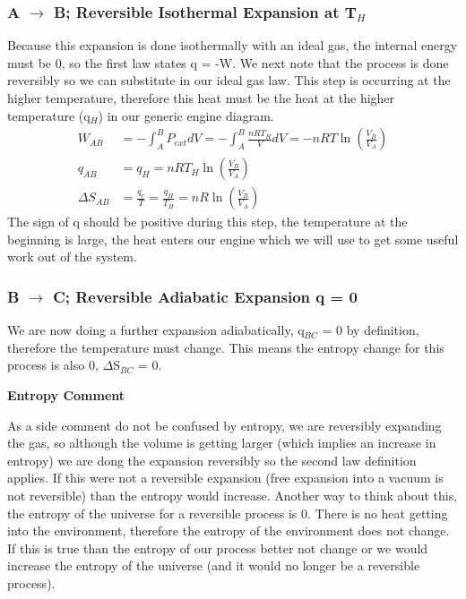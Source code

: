 \documentclass{article}
\begin{document}
\subsubsection*{A $\rightarrow$ B; Reversible Isothermal Expansion at T$_H$}
Because this expansion is done isothermally with an ideal gas, the internal energy must be 0, so the first law states q = -W. 
We next note that the process is done reversibly so we can substitute in our ideal gas law.
This step is occurring at the higher temperature, therefore this heat must be the heat at the higher temperature (q$_H$) in our generic engine diagram. 
\begin{equation}
\begin{split}
W_{AB} &= -\int_A^B P_{ext}dV = -\int_A^B \frac{nRT_H}{V}dV = -nRT\ln\left(\frac{V_B}{V_A}\right) \\
q_{AB} &= q_H = nRT_H\ln\left(\frac{V_B}{V_A}\right) \\
\Delta S_{AB} &= \frac{q_{r}}{T} = \frac{q_H}{T_H} = nR\ln\left(\frac{V_B}{V_A}\right)
\end{split}
\end{equation}
The sign of q should be positive during this step, the temperature at the beginning is large, the heat enters our engine which we will use to get some useful work out of the system. 

\subsubsection*{B $\rightarrow$ C; Reversible Adiabatic Expansion q = 0}
We are now doing a further expansion adiabatically, q$_{BC}$ = 0 by definition, therefore the temperature must change. 
This means the entropy change for this process is also 0, $\Delta$S$_{BC}$ = 0.

\textbf{Entropy Comment}

As a side comment do not be confused by entropy, we are reversibly expanding the gas, so although the volume is getting larger (which implies an increase in entropy) we are dong the expansion reversibly so the second law definition applies. 
If this were not a reversible expansion (free expansion into a vacuum is not reversible) than the entropy would increase. 
Another way to think about this, the entropy of the universe for a reversible process is 0. 
There is no heat getting into the environment, therefore the entropy of the environment does not change. 
If this is true than the entropy of our process better not change or we would increase the entropy of the universe (and it would no longer be a reversible process). 
\end{document}
